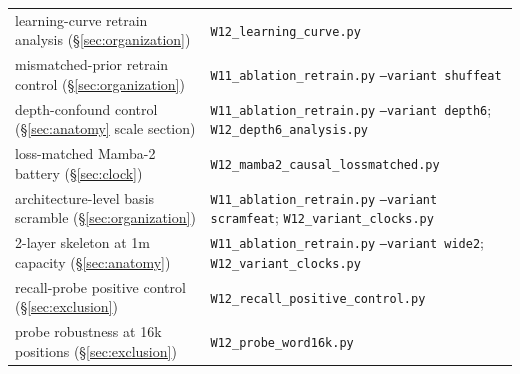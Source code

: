 \documentclass[11pt]{article}
\begin{document}
\begin{center}
\begin{tabular}{ll}
learning-curve retrain analysis (\S\ref{sec:organization}) & \texttt{W12\_learning\_curve.py} \\
mismatched-prior retrain control (\S\ref{sec:organization}) & \texttt{W11\_ablation\_retrain.py} \texttt{--variant shuffeat} \\
depth-confound control (\S\ref{sec:anatomy} scale section) & \texttt{W11\_ablation\_retrain.py} \texttt{--variant depth6}; \texttt{W12\_depth6\_analysis.py} \\
loss-matched Mamba-2 battery (\S\ref{sec:clock}) & \texttt{W12\_mamba2\_causal\_lossmatched.py} \\
architecture-level basis scramble (\S\ref{sec:organization}) & \texttt{W11\_ablation\_retrain.py} \texttt{--variant scramfeat}; \texttt{W12\_variant\_clocks.py} \\
2-layer skeleton at 1m capacity (\S\ref{sec:anatomy}) & \texttt{W11\_ablation\_retrain.py} \texttt{--variant wide2}; \texttt{W12\_variant\_clocks.py} \\
recall-probe positive control (\S\ref{sec:exclusion}) & \texttt{W12\_recall\_positive\_control.py} \\
probe robustness at 16k positions (\S\ref{sec:exclusion}) & \texttt{W12\_probe\_word16k.py} \\
\bottomrule
\end{tabular}
\end{center}
\end{document}
